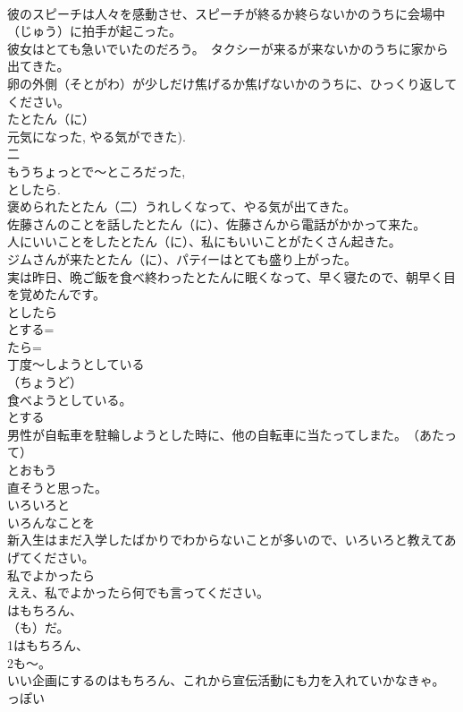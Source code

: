 \documentclass[8pt]{extreport}
\begin{document}
\begin{CJK}{UTF8}{min}
\\	彼のスピーチは人々を感動させ、スピーチが終るか終らないかのうちに会場中（じゅう）に拍手が起こった。
\\	彼女はとても急いでいたのだろう。　タクシーが来るが来ないかのうちに家から出てきた。
\\	卵の外側（そとがわ）が少しだけ焦げるか焦げないかのうちに、ひっくり返してください。
\\	たとたん（に）
\\	元気になった, やる気ができた).
\\	二 
\\	もうちょっとで～ところだった, 
\\	としたら.
\\	褒められたとたん（二）うれしくなって、やる気が出てきた。
\\	佐藤さんのことを話したとたん（に）、佐藤さんから電話がかかって来た。
\\	人にいいことをしたとたん（に）、私にもいいことがたくさん起きた。
\\	ジムさんが来たとたん（に）、パテｲーはとても盛り上がった。
\\	実は昨日、晩ご飯を食べ終わったとたんに眠くなって、早く寝たので、朝早く目を覚めたんです。
\\	としたら
\\	とする=
\\	たら=
\\	丁度～しようとしている
\\	（ちょうど）
\\	食べようとしている。
\\	とする
\\	男性が自転車を駐輪しようとした時に、他の自転車に当たってしまた。　（あたって）
\\	とおもう
\\	直そうと思った。　
\\	いろいろと
\\	いろんなことを
\\	新入生はまだ入学したばかりでわからないことが多いので、いろいろと教えてあげてください。
\\	私でよかったら
\\	ええ、私でよかったら何でも言ってください。
\\	はもちろん、
\\	（も）だ。
\\	1はもちろん、
\\	2も～。
\\	いい企画にするのはもちろん、これから宣伝活動にも力を入れていかなきゃ。
\\	っぽい

\end{CJK}
\end{document}
